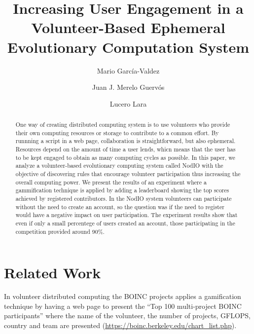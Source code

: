 \documentclass{llncs}
\begin{document}
\sloppy

\title{Increasing User Engagement in a Volunteer-Based Ephemeral Evolutionary Computation System}


\author{Mario Garc\'ia-Valdez \and Juan J. Merelo Guerv\'os \and  Lucero Lara }



\maketitle


\begin{abstract}

One way of creating distributed computing system is to use volunteers who
provide their own computing resources or storage to contribute to a common effort.
By runnning a script in a web page, collaboration is straightforward, but also ephemeral.
Resources depend on the amount of time a user lends, whicn means that 
the user has to be kept engaged to obtain as many computing cycles as
possible. In this paper, we analyze a volunteer-based evolutionary computing system called
NodIO with the objective of discovering rules that encourage volunteer
participation thus increasing the overall computing power. We present the results of
an experiment where a gammification technique is applied by adding a leaderboard 
showing the top scores achieved by registered contributors. In the NodIO system volunteers can
participate without the need to create an account, so the question was
if the need to register would have a negative impact on user participation. 
The experiment results show that even if only a small percentege of users created an account,
those participating in the competition provided around 90\%.

\end{abstract}






\section{Related Work}
\label{sec:experiments}
In volunteer distributed computing the BOINC projects applies a gamification technique 
by having a web page to present the ``Top 100 multi-project BOINC participants'' where
the name of the volunteer, the number of projects, GFLOPS, country and team are presented 
(\url{https://boinc.berkeley.edu/chart_list.php}). 
\end{document}
